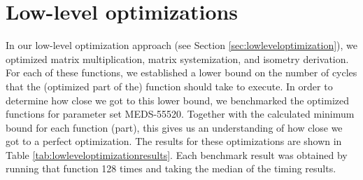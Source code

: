 \documentclass[11pt,a4paper]{report}
\theoremstyle{definition}
\begin{document}
\section{Low-level optimizations}
\label{sec:resultslowlevel}
In our low-level optimization approach (see Section \ref{sec:lowleveloptimization}), we optimized matrix multiplication, matrix systemization, and isometry derivation. For each of these functions, we established a lower bound on the number of cycles that the (optimized part of the) function should take to execute. In order to determine how close we got to this lower bound, we benchmarked the optimized functions for parameter set MEDS-55520. Together with the calculated minimum bound for each function (part), this gives us an understanding of how close we got to a perfect optimization. The results for these optimizations are shown in Table \ref{tab:lowleveloptimizationresults}. Each benchmark result was obtained by running that function 128 times and taking the median of the timing results.
\end{document}
